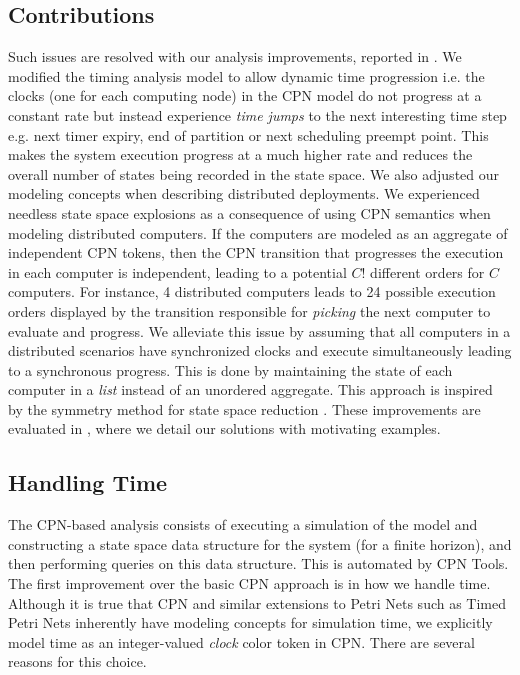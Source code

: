 \subsection{Contributions}

Such issues are resolved with our analysis improvements, reported in \cite{SEUS}. We modified the timing analysis model to allow dynamic time progression i.e. the clocks (one for each computing node) in the CPN model do not progress at a constant rate but instead experience \emph{time jumps} to the next interesting time step e.g. next timer expiry, end of partition or next scheduling preempt point. This makes the system execution progress at a much higher rate and reduces the overall number of states being recorded in the state space. We also adjusted our modeling concepts when describing distributed deployments. We experienced needless state space explosions as a consequence of using CPN semantics when modeling distributed computers. If the computers are modeled as an aggregate of independent CPN tokens, then the CPN transition that progresses the execution in each computer is independent, leading to a potential $C!$ different orders for $C$ computers. For instance, 4 distributed computers leads to 24 possible execution orders displayed by the transition responsible for \emph{picking} the next computer to evaluate and progress. We alleviate this issue by assuming that all computers in a distributed scenarios have synchronized clocks and execute simultaneously leading to a synchronous progress. This is done by maintaining the state of each computer in a \emph{list} instead of an unordered aggregate. This approach is inspired by the symmetry method for state space reduction \cite{Kristensen2000}. These improvements are evaluated in \cite{SEUS}, where we detail our solutions with motivating examples. 


\subsection{Handling Time}
\label{handling_time}

The CPN-based analysis consists of executing a simulation of the model and constructing a state space data structure for the system (for a finite horizon), and then performing queries on this data structure. This is automated by CPN Tools. The first improvement over the basic CPN approach is in how we handle time. Although it is true that CPN and similar extensions to Petri Nets such as Timed Petri Nets inherently have modeling concepts for simulation time, we explicitly model time as an integer-valued \emph{clock} color token in CPN. There are several reasons for this choice. 

